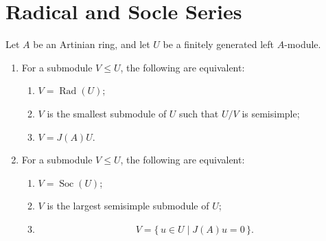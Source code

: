 \section{Radical and Socle Series}

\begin{proposition}
    Let $A$ be an Artinian ring, and let $U$ be a finitely generated left $A$-module.

    \begin{enumerate}
        \item For a submodule $V\leq U$, the following are equivalent:
              \begin{enumerate}
                  \item $V=\operatorname{Rad}(U)$;
                  \item $V$ is the smallest submodule of $U$ such that $U/V$ is semisimple;
                  \item $V=J(A)U$.
              \end{enumerate}

        \item For a submodule $V\leq U$, the following are equivalent:
              \begin{enumerate}
                  \item $V=\operatorname{Soc}(U)$;
                  \item $V$ is the largest semisimple submodule of $U$;
                  \item
                        \[
                            V=\{\,u\in U\mid J(A)u=0\,\}.
                        \]
              \end{enumerate}
    \end{enumerate}
\end{proposition}

